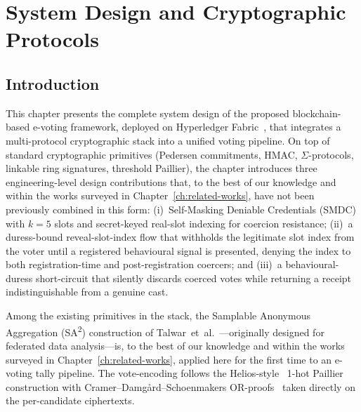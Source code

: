 \chapter{System Design and Cryptographic Protocols}
\label{ch:methodology}

\section{Introduction}
\label{sec:meth-intro}

This chapter presents the complete system design of the proposed blockchain-based e-voting framework, deployed on Hyperledger Fabric~\cite{androulaki2018}, that integrates a multi-protocol cryptographic stack into a unified voting pipeline. On top of standard cryptographic primitives (Pedersen commitments, HMAC, $\Sigma$-protocols, linkable ring signatures, threshold Paillier), the chapter introduces three engineering-level design contributions that, to the best of our knowledge and within the works surveyed in Chapter~\ref{ch:related-works}, have not been previously combined in this form: (i)~Self-Masking Deniable Credentials (SMDC) with $k=5$ slots and secret-keyed real-slot indexing for coercion resistance; (ii)~a duress-bound reveal-slot-index flow that withholds the legitimate slot index from the voter until a registered behavioural signal is presented, denying the index to both registration-time and post-registration coercers; and (iii)~a behavioural-duress short-circuit that silently discards coerced votes while returning a receipt indistinguishable from a genuine cast.

Among the existing primitives in the stack, the Samplable Anonymous Aggregation (SA\textsuperscript{2}) construction of Talwar~et~al.~\cite{sa2_apple}---originally designed for federated data analysis---is, to the best of our knowledge and within the works surveyed in Chapter~\ref{ch:related-works}, applied here for the first time to an e-voting tally pipeline. The vote-encoding follows the Helios-style~\cite{adida2008helios} 1-hot Paillier construction with Cramer--Damg{\aa}rd--Schoenmakers OR-proofs~\cite{cramer1994or} taken directly on the per-candidate ciphertexts.

